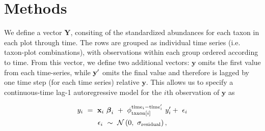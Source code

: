 

\section*{Methods}

We define a vector $\mathbf{Y}$, consiting of the standardized abundances for each taxon in each plot through time.
The rows are grouped as individual time series (i.e. taxon-plot combinations), with observations within each group
ordered according to time. From this vector, we define two additional vectors: $\mathbf{y}$ omits the first value from each
time-series, while $\mathbf{y\sp{\prime}}$ omits the final value and therefore is lagged by one time step (for each time series)
relative $\mathbf{y}$. This allows us to specify a continuous-time lag-1 autoregressive model for the $i$th
observation of $\mathbf{y}$ as

\begin{equation} \label{eq:y-i}
\begin{gathered}
y_i~=~\mathbf{x}_i~{\boldsymbol\beta}_i~+~\phi_{\text{taxon}[i]}^{\text{time}_i-\text{time}\sp{\prime}_i}~y\sp{\prime}_i
        +~\epsilon_i \\
\epsilon_i~\sim~\mathcal{N}\left(0,~\sigma_{\text{residual}}\right),
\end{gathered}
\end{equation}


